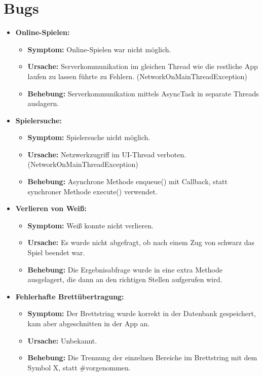\documentclass[parskip=full]{scrartcl}
\begin{document}
\section{Bugs}
\begin{itemize}
\item{\textbf{Online-Spielen:}}
	\begin{itemize}
	\item{\textbf{Symptom:}} Online-Spielen war nicht möglich.
	\item{\textbf{Ursache:}} Serverkommunikation im gleichen Thread wie die restliche App laufen zu 	lassen führte zu Fehlern. (NetworkOnMainThreadException)
	\item{\textbf{Behebung:}} Serverkommunikation mittels AsyncTask in separate Threads auslagern. 
	\end{itemize}
\item{\textbf{ Spielersuche:}} 
	\begin{itemize} 
	\item{\textbf{Symptom:}} Spielersuche nicht möglich.
	\item{\textbf{Ursache:}} Netzwerkzugriff im UI-Thread verboten. (NetworkOnMainThreadException)
	\item{\textbf{Behebung:}} Asynchrone Methode enqueue() mit Callback, statt synchroner Methode execute() verwendet. 
	\end{itemize}
\item{\textbf{Verlieren von Weiß:}}
	\begin{itemize}
	\item{\textbf{Symptom:}} Weiß konnte nicht verlieren.
	\item{\textbf{Ursache:}} Es wurde nicht abgefragt, ob nach einem Zug von schwarz das Spiel beendet war.
	\item{\textbf{Behebung:}} Die Ergebnisabfrage wurde in eine extra Methode ausgelagert, die dann an den richtigen Stellen aufgerufen wird.
	\end{itemize}
\item{\textbf{Fehlerhafte Brettübertragung:}}
	\begin{itemize}
		\item{\textbf{Symptom:}} Der Brettstring wurde korrekt in der Datenbank gespeichert, kam aber abgeschnitten in der App an.
		\item{\textbf{Ursache:}} Unbekannt.
		\item{\textbf{Behebung:}} Die Trennung der einzelnen Bereiche im Brettstring mit dem Symbol \glqq X\grqq, statt \glqq \#\grqq \space vorgenommen.
	\end{itemize}
\end{itemize}
\end{document}
